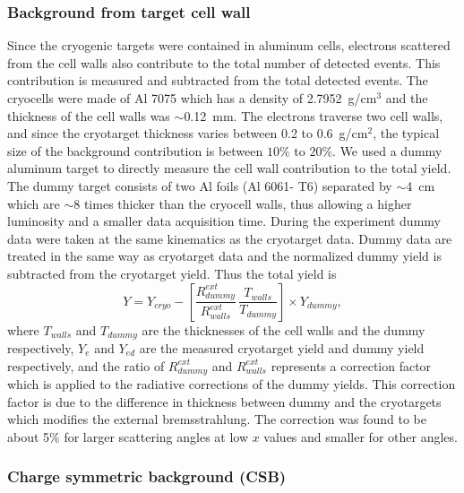 \subsubsection{Background from target cell wall}\label{bg.sssec}
Since the cryogenic targets were contained in aluminum cells, electrons
scattered from the cell walls also contribute to the total number of detected
events. This contribution is measured and subtracted from the total
detected events. The cryocells were made of Al 7075 which has a density of
2.7952~g/cm$^3$ and the thickness of the cell walls was $\sim$0.12~mm. The
electrons traverse two cell walls, and since the cryotarget thickness varies
between 0.2 to 0.6~g/cm$^2$, the typical size of the background contribution
is between $10\%$ to $20\%$. We used a dummy aluminum target to directly
measure the cell wall contribution to the total yield. The dummy target
consists of two Al foils (Al 6061- T6) separated by $\sim$4~cm which are
$\sim$8 times thicker than the cryocell walls, thus allowing a higher
luminosity and a smaller data acquisition time. During the experiment dummy
data were taken at the same kinematics as the cryotarget data. Dummy data are
treated in the same way as cryotarget data and the normalized dummy yield is
subtracted from the cryotarget yield. Thus the total yield is
%
\begin{equation}
Y = Y_{cryo}- \left[ \frac{R^{ext}_{dummy}}{R^{ext}_{walls}}\,
\frac{T_{walls}}{T_{dummy}} \right] \times Y_{dummy},
\end{equation}
%
where $T_{walls}$ and $T_{dummy}$ are the thicknesses of the cell walls and the
dummy respectively, $Y_{e}$ and $Y_{ed}$ are the measured cryotarget yield and
dummy yield respectively, and the ratio of $R^{ext}_{dummy}$ and
$R^{ext}_{walls}$ represents a correction factor which is applied to the
radiative corrections of the dummy yields. This correction factor is due to
the difference in thickness between dummy and the cryotargets which modifies
the external bremsstrahlung. The correction was found to be about 5\% for
larger scattering angles at low $x$ values and smaller for other angles.


\subsubsection{Charge symmetric  background (CSB)}\label{csbg.sssec}

